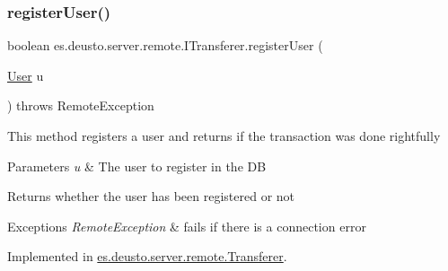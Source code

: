 \mbox{\label{interfacees_1_1deusto_1_1server_1_1remote_1_1_i_transferer_ab805207e578865de5bf2e69ca8942344}} 
\subsubsection{\texorpdfstring{register\+User()}{registerUser()}}
{\footnotesize\ttfamily boolean es.\+deusto.\+server.\+remote.\+I\+Transferer.\+register\+User (\begin{DoxyParamCaption}\item[{\hyperlink{classes_1_1deusto_1_1server_1_1db_1_1data_1_1_user}{User}}]{u }\end{DoxyParamCaption}) throws Remote\+Exception}

This method registers a user and returns if the transaction was done rightfully 
\begin{DoxyParams}{Parameters}
{\em u} & The user to register in the DB \\
\hline
\end{DoxyParams}
\begin{DoxyReturn}{Returns}
whether the user has been registered or not 
\end{DoxyReturn}

\begin{DoxyExceptions}{Exceptions}
{\em Remote\+Exception} & fails if there is a connection error \\
\hline
\end{DoxyExceptions}


Implemented in \hyperlink{classes_1_1deusto_1_1server_1_1remote_1_1_transferer_a80e2dd7db595bdd8d39969e5d0e8ae7b}{es.\+deusto.\+server.\+remote.\+Transferer}.

\mbox{\label{interfacees_1_1deusto_1_1server_1_1remote_1_1_i_transferer_a1fb33a5447e1647ffde8a01d180b8d99}} 
